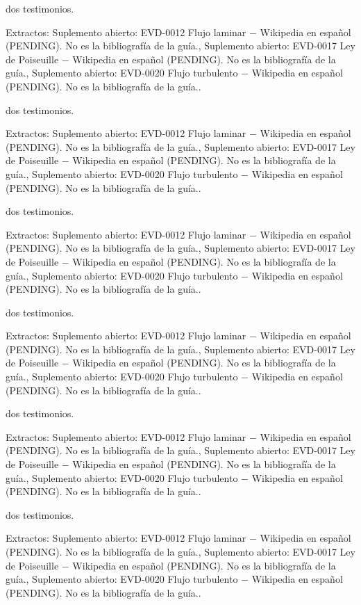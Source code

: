 \documentclass{book}
\begin{document}
\noindent dos testimonios.

\noindent Extractos: Suplemento abierto: EVD-0012 Flujo laminar \(-\) Wikipedia en español (PENDING). No es la bibliografía de la guía., Suplemento abierto: EVD-0017 Ley de Poiseuille \(-\) Wikipedia en español (PENDING). No es la bibliografía de la guía., Suplemento abierto: EVD-0020 Flujo turbulento \(-\) Wikipedia en español (PENDING). No es la bibliografía de la guía..

\noindent dos testimonios.

\noindent Extractos: Suplemento abierto: EVD-0012 Flujo laminar \(-\) Wikipedia en español (PENDING). No es la bibliografía de la guía., Suplemento abierto: EVD-0017 Ley de Poiseuille \(-\) Wikipedia en español (PENDING). No es la bibliografía de la guía., Suplemento abierto: EVD-0020 Flujo turbulento \(-\) Wikipedia en español (PENDING). No es la bibliografía de la guía..

\noindent dos testimonios.

\noindent Extractos: Suplemento abierto: EVD-0012 Flujo laminar \(-\) Wikipedia en español (PENDING). No es la bibliografía de la guía., Suplemento abierto: EVD-0017 Ley de Poiseuille \(-\) Wikipedia en español (PENDING). No es la bibliografía de la guía., Suplemento abierto: EVD-0020 Flujo turbulento \(-\) Wikipedia en español (PENDING). No es la bibliografía de la guía..

\noindent dos testimonios.

\noindent Extractos: Suplemento abierto: EVD-0012 Flujo laminar \(-\) Wikipedia en español (PENDING). No es la bibliografía de la guía., Suplemento abierto: EVD-0017 Ley de Poiseuille \(-\) Wikipedia en español (PENDING). No es la bibliografía de la guía., Suplemento abierto: EVD-0020 Flujo turbulento \(-\) Wikipedia en español (PENDING). No es la bibliografía de la guía..

\noindent dos testimonios.

\noindent Extractos: Suplemento abierto: EVD-0012 Flujo laminar \(-\) Wikipedia en español (PENDING). No es la bibliografía de la guía., Suplemento abierto: EVD-0017 Ley de Poiseuille \(-\) Wikipedia en español (PENDING). No es la bibliografía de la guía., Suplemento abierto: EVD-0020 Flujo turbulento \(-\) Wikipedia en español (PENDING). No es la bibliografía de la guía..

\noindent dos testimonios.

\noindent Extractos: Suplemento abierto: EVD-0012 Flujo laminar \(-\) Wikipedia en español (PENDING). No es la bibliografía de la guía., Suplemento abierto: EVD-0017 Ley de Poiseuille \(-\) Wikipedia en español (PENDING). No es la bibliografía de la guía., Suplemento abierto: EVD-0020 Flujo turbulento \(-\) Wikipedia en español (PENDING). No es la bibliografía de la guía..
\end{document}
